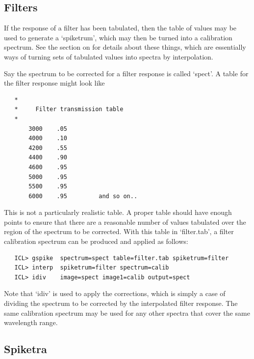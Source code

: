 
\subsection{\label{techno3}Filters}

   If the response of a filter has been tabulated, then the table of
   values may be used to generate a `spiketrum', which may then be
   turned into a calibration spectrum.  See
   {the section on }
   for details about these things, which are essentially ways of turning
   sets of tabulated values into spectra by interpolation.

   Say the spectrum to be corrected for a filter response is called
   `spect'.  A table for the filter response might look like

\begin{verbatim}
   *
   *     Filter transmission table
   *
       3000    .05
       4000    .10
       4200    .55
       4400    .90
       4600    .95
       5000    .95
       5500    .95
       6000    .95         and so on..
\end{verbatim}

   This is not a particularly realistic table.  A proper table should
   have enough points to ensure that there are a reasonable number of
   values tabulated over the region of the spectrum to be corrected.
   With this table in `filter.tab', a filter calibration spectrum can be
   produced and applied as follows:

\begin{verbatim}
   ICL> gspike  spectrum=spect table=filter.tab spiketrum=filter
   ICL> interp  spiketrum=filter spectrum=calib
   ICL> idiv    image=spect image1=calib output=spect
\end{verbatim}

   Note that `idiv' is used to apply the corrections, which is simply a
   case of dividing the spectrum to be corrected by the interpolated
   filter response.  The same calibration spectrum may be used for any
   other spectra that cover the same wavelength range.


\subsection{\label{techno4}Spiketra}

